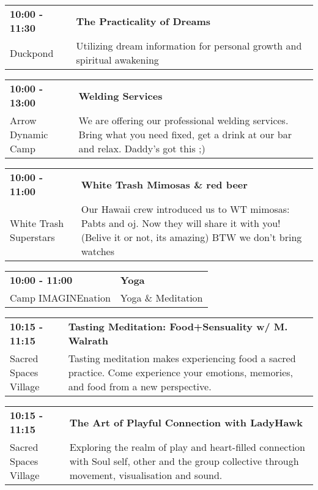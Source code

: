 \begin{tabular}{ p{1in} p{2.2in} }
    \textbf{10:00 - 11:30} & \textbf{The Practicality of Dreams} \\
    Duckpond \newline  & Utilizing dream information for personal growth and spiritual awakening \\
    \hline 
\end{tabular}
    
\begin{tabular}{ p{1in} p{2.2in} }
    \textbf{10:00 - 13:00} & \textbf{Welding Services} \\
    Arrow Dynamic Camp \newline  & We are offering our professional welding services.  Bring what you need fixed, get a drink at our bar and relax. Daddy's got this ;) \\
    \hline 
\end{tabular}
    
\begin{tabular}{ p{1in} p{2.2in} }
    \textbf{10:00 - 11:00} & \textbf{White Trash Mimosas \& red beer} \\
    White Trash Superstars \newline  & Our Hawaii crew introduced us to WT mimosas: Pabts and oj. Now they will share it with you! (Belive it or not, its amazing) BTW we don't bring watches \\
    \hline 
\end{tabular}
    
\begin{tabular}{ p{1in} p{2.2in} }
    \textbf{10:00 - 11:00} & \textbf{Yoga} \\
    Camp IMAGINEnation \newline  & Yoga \& Meditation \\
    \hline 
\end{tabular}
    
\begin{tabular}{ p{1in} p{2.2in} }
    \textbf{10:15 - 11:15} & \textbf{Tasting Meditation: Food+Sensuality w/ M. Walrath} \\
    Sacred Spaces Village \newline  & Tasting meditation makes experiencing food a sacred practice. Come experience your emotions, memories, and food from a new perspective. \\
    \hline 
\end{tabular}
    
\begin{tabular}{ p{1in} p{2.2in} }
    \textbf{10:15 - 11:15} & \textbf{The Art of Playful Connection with LadyHawk} \\
    Sacred Spaces Village \newline  & Exploring the realm of play and heart-filled connection with Soul self, other and the group collective through movement, visualisation and sound. \\
    \hline 
\end{tabular}
    
